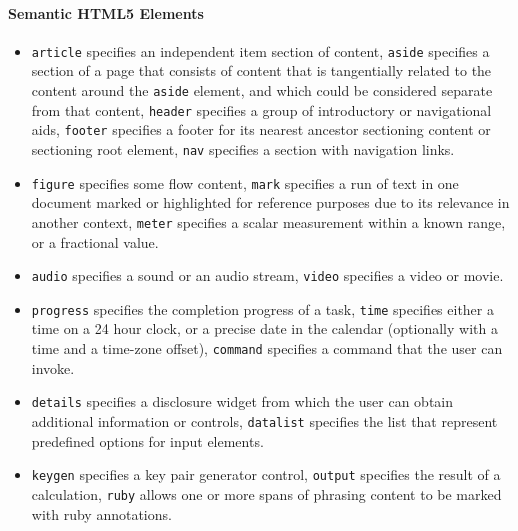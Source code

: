 \documentclass[12pt]{article}
\begin{document}
\paragraph{Semantic HTML5 Elements}
\begin{itemize}
\item \texttt{article} specifies an independent item section of content, \texttt{aside} specifies a section of a page that consists of content that is tangentially related to the content around the \texttt{aside} element, and which could be considered separate from that content, \texttt{header} specifies a group of introductory or navigational aids, \texttt{footer} specifies a footer for its nearest ancestor sectioning content or sectioning root element, \texttt{nav} specifies a section with navigation links.
\item \texttt{figure} specifies some flow content, \texttt{mark} specifies a run of text in one document marked or highlighted for reference purposes due to its relevance in another context, \texttt{meter} specifies a scalar measurement within a known range, or a fractional value.
\item \texttt{audio} specifies a sound or an audio stream, \texttt{video} specifies a video or movie.
\item \texttt{progress} specifies the completion progress of a task, \texttt{time} specifies either a time on a 24 hour clock, or a precise date in the calendar (optionally with a time and a time-zone offset), \texttt{command} specifies a command that the user can invoke.
\item \texttt{details} specifies a disclosure widget from which the user can obtain additional information or controls, \texttt{datalist} specifies the list that represent predefined options for input elements.
\item \texttt{keygen} specifies a key pair generator control, \texttt{output} specifies the result of a calculation, \texttt{ruby} allows one or more spans of phrasing content to be marked with ruby annotations.
\end{itemize}
\end{document}
